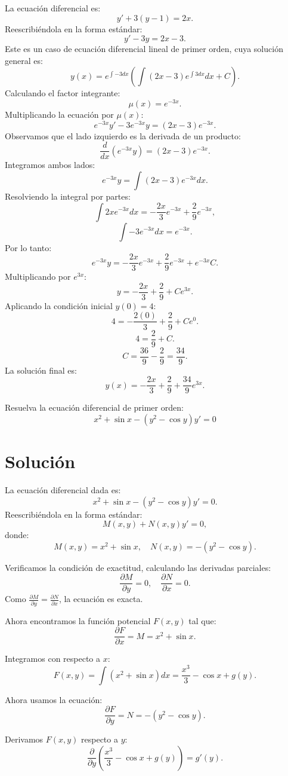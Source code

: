 \documentclass[12pt]{exam}
\begin{document}
\begin{questions}
La ecuación diferencial es:
\[
y' + 3(y - 1) = 2x.
\]
Reescribiéndola en la forma estándar:
\[
y' - 3y = 2x - 3.
\]
Este es un caso de ecuación diferencial lineal de primer orden, cuya solución general es:
\[
y(x) = e^{\int -3dx} \left( \int (2x - 3) e^{\int 3dx}dx + C \right).
\]
Calculando el factor integrante:
\[
\mu(x) = e^{-3x}.
\]
Multiplicando la ecuación por $\mu(x)$:
\[
e^{-3x} y' - 3e^{-3x} y = (2x - 3)e^{-3x}.
\]
Observamos que el lado izquierdo es la derivada de un producto:
\[
\frac{d}{dx} \left( e^{-3x} y \right) = (2x - 3)e^{-3x}.
\]
Integramos ambos lados:
\[
e^{-3x} y = \int (2x - 3)e^{-3x}dx.
\]
Resolviendo la integral por partes:
\[
\int 2x e^{-3x}dx = -\frac{2x}{3} e^{-3x} + \frac{2}{9} e^{-3x},
\]
\[
\int -3 e^{-3x}dx = e^{-3x}.
\]
Por lo tanto:
\[
e^{-3x} y = -\frac{2x}{3} e^{-3x} + \frac{2}{9} e^{-3x} + e^{-3x} C.
\]
Multiplicando por $e^{3x}$:
\[
y = -\frac{2x}{3} + \frac{2}{9} + C e^{3x}.
\]
Aplicando la condición inicial $y(0) = 4$:
\[
4 = -\frac{2(0)}{3} + \frac{2}{9} + C e^{0}.
\]
\[
4 = \frac{2}{9} + C.
\]
\[
C = \frac{36}{9} - \frac{2}{9} = \frac{34}{9}.
\]
La solución final es:
\[
y(x) = -\frac{2x}{3} + \frac{2}{9} + \frac{34}{9} e^{3x}.
\]


\question Resuelva la ecuación diferencial de primer orden:
\[
x^2 + \sin{x} - (y^2 - \cos{y}) y' = 0
\]

\section*{Solución}

La ecuación diferencial dada es:
\[
x^2 + \sin{x} - (y^2 - \cos{y}) y' = 0.
\]
Reescribiéndola en la forma estándar:
\[
M(x, y) + N(x, y) y' = 0,
\]
donde:
\[
M(x, y) = x^2 + \sin{x}, \quad N(x, y) = -(y^2 - \cos{y}).
\]

Verificamos la condición de exactitud, calculando las derivadas parciales:
\[
\frac{\partial M}{\partial y} = 0, \quad \frac{\partial N}{\partial x} = 0.
\]
Como \(\frac{\partial M}{\partial y} = \frac{\partial N}{\partial x}\), la ecuación es exacta.

Ahora encontramos la función potencial \( F(x, y) \) tal que:
\[
\frac{\partial F}{\partial x} = M = x^2 + \sin{x}.
\]

Integramos con respecto a \(x\):
\[
F(x, y) = \int (x^2 + \sin{x})dx = \frac{x^3}{3} - \cos{x} + g(y).
\]

Ahora usamos la ecuación:
\[
\frac{\partial F}{\partial y} = N = -(y^2 - \cos{y}).
\]

Derivamos \(F(x, y)\) respecto a \(y\):
\[
\frac{\partial}{\partial y} \left( \frac{x^3}{3} - \cos{x} + g(y) \right) = g'(y).
\]


\end{questions}
\end{document}
